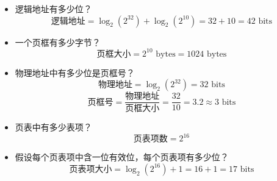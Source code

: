 \documentclass[b5paper, twoside]{article}
\begin{document}
\begin{itemize}
\begin{itemize}
		\item 逻辑地址有多少位？
		\[
		\text{逻辑地址} = \log_2(2^{32}) + \log_2(2^{10}) = 32 + 10 = 42 \text{ 
		bits}
		\]
		\item 一个页框有多少字节？
		\[
		\text{页框大小} = 2^{10} \text{ bytes} = 1024 \text{ bytes}
		\]
		\item 物理地址中有多少位是页框号？
		\[
		\text{物理地址} = \log_2(2^{32}) = 32 \text{ bits}
		\]
		\[
		\text{页框号} = \frac{\text{物理地址}}{\text{页框大小}} = \frac{32}{10} = 
		3.2 \approx 3 \text{ bits}
		\]
		\item 页表中有多少表项？
		\[
		\text{页表项数} = 2^{16}
		\]
		\item 假设每个页表项中含一位有效位，每个页表项有多少位？
		\[
		\text{页表项大小} = \log_2(2^{16}) + 1 = 16 + 1 = 17 \text{ bits}
		\]
	\end{itemize}
\end{itemize}


\label{toc}
\end{document}
